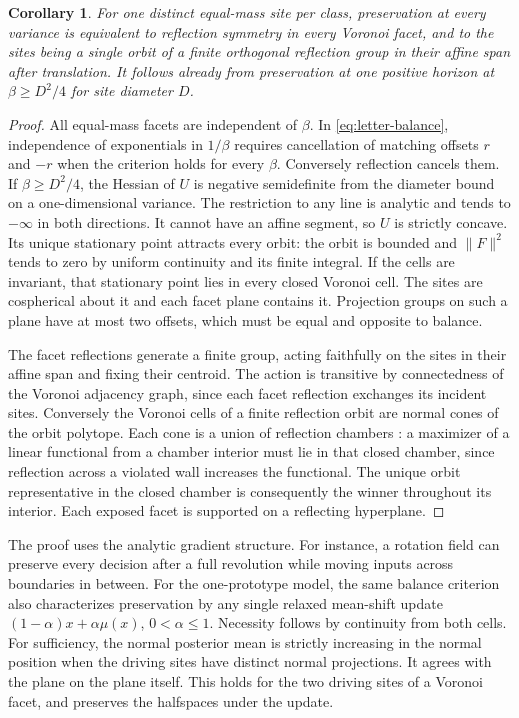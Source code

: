 \documentclass[final,5p,twocolumn]{elsarticle}
\newtheorem{corollary}[theorem]{Corollary}
\begin{document}
\begin{corollary}
\label{cor:letter}
For one distinct equal-mass site per class, preservation at every
variance is equivalent to reflection symmetry in every Voronoi
facet, and to the sites being a single orbit of a finite orthogonal
reflection group in their affine span after translation. It follows
already from preservation at one positive horizon at
$\beta\ge D^2/4$ for site diameter $D$.
\end{corollary}

\begin{proof}
All equal-mass facets are independent of $\beta$. In
\eqref{eq:letter-balance}, independence of exponentials in $1/\beta$
requires cancellation of matching offsets $r$ and $-r$ when the
criterion holds for every $\beta$. Conversely reflection cancels
them. If $\beta\ge D^2/4$, the Hessian of $U$ is negative
semidefinite from the diameter bound on a one-dimensional
variance. The restriction to any line is analytic and tends to
$-\infty$ in both directions. It cannot have an affine segment,
so $U$ is strictly concave. Its unique stationary point attracts
every orbit: the orbit is bounded and $\|F\|^2$ tends to zero by
uniform continuity and its finite integral. If the cells are
invariant, that stationary point lies in every closed Voronoi cell.
The sites are cospherical about it and each facet plane contains it.
Projection groups on such a plane have at most two offsets, which
must be equal and opposite to balance.

The facet reflections generate a finite group, acting faithfully
on the sites in their affine span and fixing their centroid. The
action is transitive by connectedness of the Voronoi adjacency
graph, since each facet reflection exchanges its incident sites.
Conversely the Voronoi cells of a finite reflection orbit are
normal cones of the orbit polytope. Each cone is a union of
reflection chambers \cite{ardila}: a maximizer of a linear
functional from a chamber interior must lie in that closed chamber,
since reflection across a violated wall increases the functional.
The unique orbit representative in the closed chamber is consequently
the winner throughout its interior. Each exposed facet is supported
on a reflecting hyperplane.
\end{proof}

The proof uses the analytic gradient structure. For instance, a
rotation field can preserve every decision after a full revolution
while moving inputs across boundaries in between. For the
one-prototype model, the same balance criterion also characterizes
preservation by any single relaxed mean-shift update
$(1-\alpha)x+\alpha\mu(x)$, $0<\alpha\le1$. Necessity follows by
continuity from both cells. For sufficiency, the normal posterior
mean is strictly increasing in the normal position when the driving
sites have distinct normal projections. It agrees with the plane
on the plane itself. This holds for the two driving sites of a
Voronoi facet, and preserves the halfspaces under the update.
\end{document}
